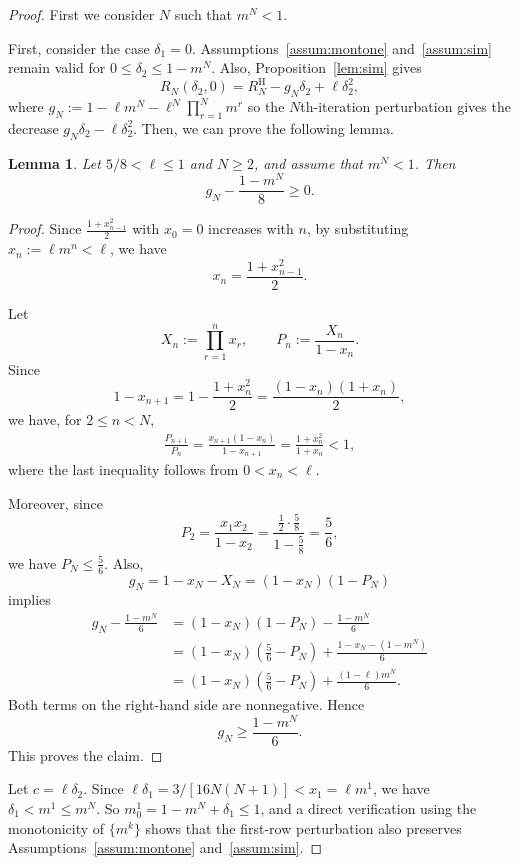 \documentclass[pdflatex,sn-mathphys-num]{sn-jnl}%
\theoremstyle{thmstyleone}%
\theoremstyle{thmstyletwo}%
\theoremstyle{thmstylethree}%
\newtheorem{lemma}{Lemma}%
\begin{document}
\begin{proof}
First we consider $N$ such that $m^N<1$.

First, consider the case $\delta_1=0$. Assumptions~\ref{assum:montone} and~\ref{assum:sim} remain valid for $0\le\delta_2\le1-m^N$. Also, Proposition~\ref{lem:sim} gives
\[R_N(\delta_2,0)=R_N^{\mathrm H}-g_N\delta_2+\ell\delta_2^2,\]
where $g_N:=1-\ell m^N-\ell^N\prod_{r=1}^{N}m^r$ so the $N$th-iteration perturbation gives the decrease $g_N\delta_2-\ell\delta_2^2$.
Then, we can prove the following lemma.
\begin{lemma}
Let \(5/8<\ell\le 1\) and \(N\ge 2\), and assume that \(m^N<1\). Then
\[
g_N-\frac{1-m^N}{8}
\ge 0.
\]
\end{lemma}
\begin{proof}
Since $\frac{1+x_{n-1}^2}{2}$ with $x_0=0$ increases with $n$, by substituting $x_n:=\ell m^n < \ell $, we have
\[
x_n
=\frac{1+x_{n-1}^2}{2}.
\]

Let
\[
X_n:=\prod_{r=1}^n x_r,
\qquad
P_n:=\frac{X_n}{1-x_n}.
\]
Since
\[
1-x_{n+1}
=
1-\frac{1+x_n^2}{2}
=
\frac{(1-x_n)(1+x_n)}{2},
\]
we have, for \(2\le n<N\),
\[
\begin{aligned}
\frac{P_{n+1}}{P_n}
=
\frac{x_{n+1}(1-x_n)}{1-x_{n+1}} =
\frac{1+x_n^2}{1+x_n}
<1,
\end{aligned}
\]
where the last inequality follows from \(0<x_n<\ell\).

Moreover, since
\[
P_2
=
\frac{x_1x_2}{1-x_2}
=
\frac{\frac12\cdot\frac58}{1-\frac58}
=
\frac56,
\]
we have $P_N \le \frac{5}{6}$. Also,
\[
g_N
=
1-x_N-X_N
=
(1-x_N)(1-P_N)
\]
 implies
\[
\begin{aligned}
g_N-\frac{1-m^N}{6}
&=
(1-x_N)(1-P_N)-\frac{1-m^N}{6} \\
&=
(1-x_N)\left(\frac56-P_N\right)
 +\frac{1-x_N-(1-m^N)}{6} \\
&=
(1-x_N)\left(\frac56-P_N\right)
 +\frac{(1-\ell)m^N}{6}.
\end{aligned}
\]
Both terms on the right-hand side are nonnegative. Hence
\[
g_N\ge \frac{1-m^N}{6}.
\]
This proves the claim.
\end{proof}
Let $c=\ell\delta_2.$ Since $\ell\delta_1=3/[16N(N+1)]<x_1=\ell m^1$, we have $\delta_1<m^1\le m^N$. So $m_0^1=1-m^N+\delta_1\le1$, and a direct verification using the monotonicity of $\{m^k\}$ shows that the first-row perturbation also preserves Assumptions~\ref{assum:montone} and~\ref{assum:sim}.


\end{proof}
\end{document}
